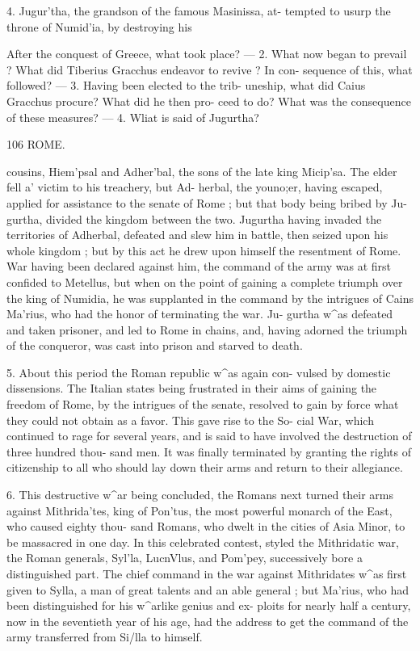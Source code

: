\documentclass[openany,a4paper]{memoir}
\begin{document}
4. Jugur'tha, the grandson of the famous Masinissa, at- 
tempted to usurp the throne of Numid'ia, by destroying his 

After the conquest of Greece, what took place? — 2. What now began 
to prevail ? What did Tiberius Gracchus endeavor to revive ? In con- 
sequence of this, what followed? — 3. Having been elected to the trib- 
uneship, what did Caius Gracchus procure? What did he then pro- 
ceed to do? What was the consequence of these measures? — 4. Wliat is 
said of Jugurtha? 



106 ROME. 

cousins, Hiem'psal and Adher'bal, the sons of the late king 
Micip'sa. The elder fell a' victim to his treachery, but Ad- 
herbal, the youno;er, having escaped, applied for assistance 
to the senate of Rome ; but that body being bribed by Ju- 
gurtha, divided the kingdom between the two. Jugurtha 
having invaded the territories of Adherbal, defeated and slew 
him in battle, then seized upon his whole kingdom ; but by 
this act he drew upon himself the resentment of Rome. War 
having been declared against him, the command of the army 
was at first confided to Metellus, but when on the point of 
gaining a complete triumph over the king of Numidia, he 
was supplanted in the command by the intrigues of Cains 
Ma'rius, who had the honor of terminating the war. Ju- 
gurtha w^as defeated and taken prisoner, and led to Rome in 
chains, and, having adorned the triumph of the conqueror, 
was cast into prison and starved to death. 

5. About this period the Roman republic w^as again con- 
vulsed by domestic dissensions. The Italian states being 
frustrated in their aims of gaining the freedom of Rome, by 
the intrigues of the senate, resolved to gain by force what 
they could not obtain as a favor. This gave rise to the So- 
cial War, which continued to rage for several years, and is 
said to have involved the destruction of three hundred thou- 
sand men. It was finally terminated by granting the rights 
of citizenship to all who should lay down their arms and 
return to their allegiance. 

6. This destructive w^ar being concluded, the Romans next 
turned their arms against Mithrida'tes, king of Pon'tus, the 
most powerful monarch of the East, who caused eighty thou- 
sand Romans, who dwelt in the cities of Asia Minor, to be 
massacred in one day. In this celebrated contest, styled the 
Mithridatic war, the Roman generals, Syl'la, LucnVlus, and 
Pom'pey, successively bore a distinguished part. The chief 
command in the war against Mithridates w^as first given to 
Sylla, a man of great talents and an able general ; but Ma'rius, 
who had been distinguished for his w^arlike genius and ex- 
ploits for nearly half a century, now in the seventieth year 
of his age, had the address to get the command of the army 
transferred from Si/lla to himself. 
\end{document}
